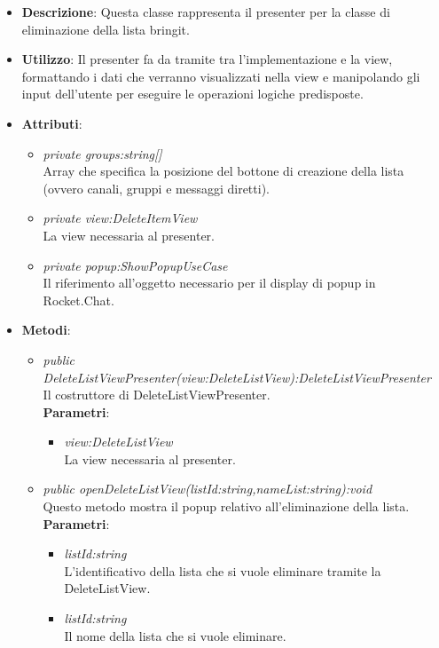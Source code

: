 \begin{itemize}
\item \textbf{Descrizione}: Questa classe rappresenta il presenter per la classe di eliminazione della lista bringit.
\item \textbf{Utilizzo}: Il presenter fa da tramite tra l'implementazione e la view, formattando i dati che verranno visualizzati nella view e manipolando gli input dell'utente per eseguire le operazioni logiche predisposte.
\item \textbf{Attributi}: 
	\begin{itemize}
	\item \textit{private groups:string[]}\\
	Array che specifica la posizione del bottone di creazione della lista (ovvero canali, gruppi e messaggi diretti).
	\item \textit{private view:DeleteItemView}\\
	La view necessaria al presenter.
	\item \textit{private popup:ShowPopupUseCase}\\
	Il riferimento all'oggetto necessario per il display di popup in Rocket.Chat.
	\end{itemize}
\item \textbf{Metodi}:
	\begin{itemize}
	\item \textit{public DeleteListViewPresenter(view:DeleteListView):DeleteListViewPresenter}\\
	Il costruttore di DeleteListViewPresenter.
					\\ \textbf{Parametri}: \begin{itemize}
			\item \textit{view:DeleteListView}\\
			La view necessaria al presenter.
					\end{itemize} 
	\item \textit{public openDeleteListView(listId:string,nameList:string):void}\\
	Questo metodo mostra il popup relativo all'eliminazione della lista.
					\\ \textbf{Parametri}: \begin{itemize}
			\item \textit{listId:string}\\
			L'identificativo della lista che si vuole eliminare tramite la DeleteListView.
			\item \textit{listId:string}\\
			Il nome della lista che si vuole eliminare.
					\end{itemize} 
	\end{itemize}
\end{itemize} 
